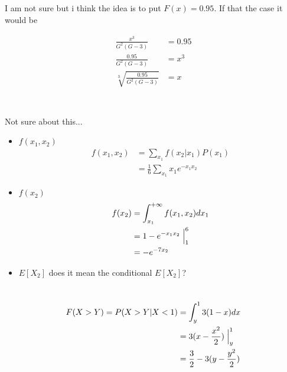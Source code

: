\documentclass[12pt, a4paper]{article}
\begin{document}
\subsection{}
I am not sure but i think the idea is to put $F(x) = 0.95$. If that the case it would be 

\begin{subequations}
  \begin{align}
    \frac{x^3}{G^2(G - 3)}  &= 0.95\\
    \frac{0.95}{G^2(G - 3)} &= x^3\\
    \sqrt[3]{\frac{0.95}{G^2(G - 3)}} &= x\\
  \end{align}
\end{subequations}

\section{}

Not sure about this...

\begin{itemize}
  \item $f(x_1, x_2)$
  \begin{subequations}
    \begin{align}
      f(x_1,x_2) &= \sum_{x_1}f(x_2 | x_1)P(x_1)\\
                 &= \frac{1}{6}\sum_{x_1}x_1e^{-x_1x_2}
    \end{align}
  \end{subequations}
  \item $f(x_2)$
  \begin{subequations}
    \begin{align}
      f(x_2) &= \int_{x_1}^{+\infty}f(x_1, x_2) dx_1 \\
                 &= 1-e^{-x_1x_2}\Bigm|_1^6\\
                 &= -e^{-7x_2}
    \end{align}
  \end{subequations}
  \item $E[X_2]$ does it mean the conditional $E[X_2]$?
\end{itemize}

\section{}
\subsection{}
\begin{subequations}
  \begin{align}
    F(X > Y) = P(X > Y | X < 1) &= \int_y^1 3(1 - x) dx \\
               &= 3(x - \frac{x^2}{2})\Bigm|_y^1\\
               &= \frac{3}{2} - 3(y - \frac{y^2}{2})
  \end{align}
\end{subequations}
\end{document}
